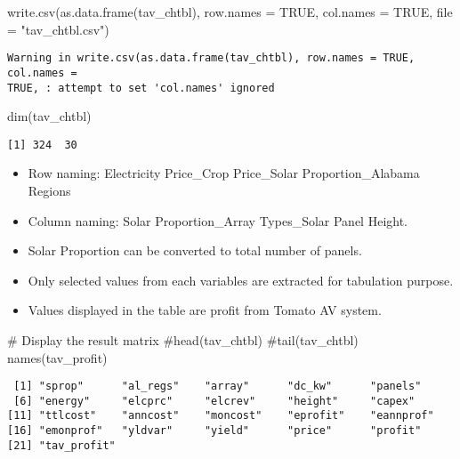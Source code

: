 \documentclass[
  letterpaper,
  DIV=11,
  numbers=noendperiod]{scrartcl}
\newenvironment{Shaded}{\begin{snugshade}}{\end{snugshade}}
\newcommand{\AttributeTok}[1]{\textcolor[rgb]{0.40,0.45,0.13}{#1}}
\newcommand{\CommentTok}[1]{\textcolor[rgb]{0.37,0.37,0.37}{#1}}
\newcommand{\ConstantTok}[1]{\textcolor[rgb]{0.56,0.35,0.01}{#1}}
\newcommand{\FunctionTok}[1]{\textcolor[rgb]{0.28,0.35,0.67}{#1}}
\newcommand{\NormalTok}[1]{\textcolor[rgb]{0.00,0.23,0.31}{#1}}
\newcommand{\StringTok}[1]{\textcolor[rgb]{0.13,0.47,0.30}{#1}}
\begin{document}
\begin{Shaded}
\begin{Highlighting}[]
\FunctionTok{write.csv}\NormalTok{(}\FunctionTok{as.data.frame}\NormalTok{(tav\_chtbl),}
          \AttributeTok{row.names =} \ConstantTok{TRUE}\NormalTok{,}
          \AttributeTok{col.names =} \ConstantTok{TRUE}\NormalTok{,}
          \AttributeTok{file =} \StringTok{"tav\_chtbl.csv"}\NormalTok{)}
\end{Highlighting}
\end{Shaded}

\begin{verbatim}
Warning in write.csv(as.data.frame(tav_chtbl), row.names = TRUE, col.names =
TRUE, : attempt to set 'col.names' ignored
\end{verbatim}

\begin{Shaded}
\begin{Highlighting}[]
\FunctionTok{dim}\NormalTok{(tav\_chtbl)}
\end{Highlighting}
\end{Shaded}

\begin{verbatim}
[1] 324  30
\end{verbatim}

\begin{itemize}
\item
  Row naming: Electricity Price\_Crop Price\_Solar Proportion\_Alabama
  Regions
\item
  Column naming: Solar Proportion\_Array Types\_Solar Panel Height.
\item
  Solar Proportion can be converted to total number of panels.
\item
  Only selected values from each variables are extracted for tabulation
  purpose.
\item
  Values displayed in the table are profit from Tomato AV system.
\end{itemize}

\begin{Shaded}
\begin{Highlighting}[]
\CommentTok{\# Display the result matrix}
\CommentTok{\#head(tav\_chtbl)}
\CommentTok{\#tail(tav\_chtbl)}
\FunctionTok{names}\NormalTok{(tav\_profit)}
\end{Highlighting}
\end{Shaded}

\begin{verbatim}
 [1] "sprop"      "al_regs"    "array"      "dc_kw"      "panels"    
 [6] "energy"     "elcprc"     "elcrev"     "height"     "capex"     
[11] "ttlcost"    "anncost"    "moncost"    "eprofit"    "eannprof"  
[16] "emonprof"   "yldvar"     "yield"      "price"      "profit"    
[21] "tav_profit"
\end{verbatim}
\end{document}
